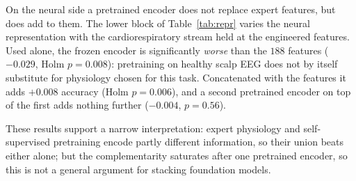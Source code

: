 \documentclass{ieeeaccess}
\begin{document}
On the neural side a pretrained encoder does not replace expert features, but does
add to them. The lower block of Table~\ref{tab:repr} varies the neural representation with the
cardiorespiratory stream held at the engineered features. Used alone, the frozen encoder is
significantly \emph{worse} than the $188$ features ($-0.029$, Holm $p=0.008$): pretraining on
healthy scalp EEG does not by itself substitute for physiology chosen for this task.
Concatenated with the features it adds $+0.008$ accuracy (Holm $p=0.006$), and a second
pretrained encoder on top of the first adds nothing further ($-0.004$, $p=0.56$).

These results support a narrow interpretation: expert physiology and
self-supervised pretraining encode partly different information, so their union beats either
alone; but the complementarity saturates after one pretrained encoder, so this is not a
general argument for stacking foundation models.
\end{document}

